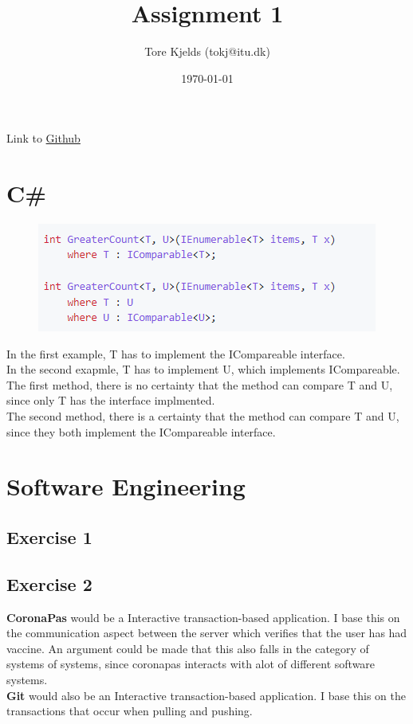 \documentclass{article}
\title{Assignment 1}
\author{Tore Kjelds (tokj@itu.dk)}
\date{\today}
\begin{document}
\maketitle
Link to \href{https://github.com/tkjelds/BDSA_assignment01}{Github} 
\section*{C\#}
\begin{figure}[!htb]
    \begin{center}
        \includegraphics[scale = 0.7]{img/GreaterCount.png}
    \end{center}
\end{figure}
In the first example, T has to implement the ICompareable interface. \\
In the second exapmle, T has to implement U, which implements ICompareable. \\ 
The first method, there is no certainty that the method can compare T and U, since only T has the interface implmented. \\
The second method, there is a certainty that the method can compare T and U, since they both implement the ICompareable interface. \\ 
\section*{Software Engineering}
\subsection*{Exercise 1}
\subsection*{Exercise 2}
\textbf{CoronaPas} would be a Interactive transaction-based application. I base this on the communication aspect between the server which verifies that the user has had vaccine. An argument could be made that this also falls in the category of systems of systems, since coronapas interacts with alot of different software systems. 
\\
\textbf{Git} would also be an Interactive transaction-based application. I base this on the transactions that occur when pulling and pushing. 
\end{document}
